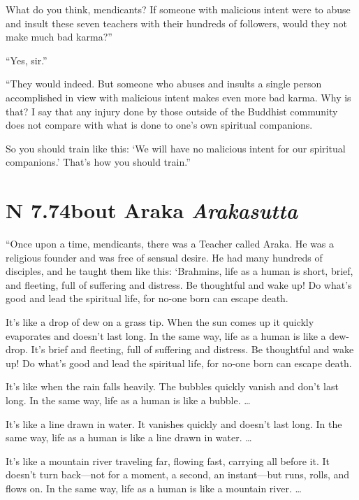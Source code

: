 \documentclass[12pt,openany]{book}%
\newcommand*{\suttatitleacronym}[1]{\smaller[2]{#1}\vspace*{.3em}}
\newcommand*{\suttatitletranslation}[1]{\linebreak{#1}}
\newcommand*{\suttatitleroot}[1]{\linebreak\smaller[2]\itshape{#1}}
\newcommand*{\tocacronym}[1]{\hspace*{-3.3em}{#1}\quad}
\newcommand*{\toctranslation}[1]{#1}
\newcommand*{\tocroot}[1]{(\textit{#1})}
\begin{document}
What do you think, mendicants? If someone with malicious intent were to abuse and insult these seven teachers with their hundreds of followers, would they not make much bad karma?” 

“Yes, sir.” 

“They would indeed. But someone who abuses and insults a single person accomplished in view with malicious intent makes even more bad karma. Why is that? I say that any injury done by those outside of the Buddhist community does not compare with what is done to one’s own spiritual companions. 

So you should train like this: ‘We will have no malicious intent for our spiritual companions.’ That’s how you should train.” 

%
\section*{{\suttatitleacronym AN 7.74}{\suttatitletranslation About Araka }{\suttatitleroot Arakasutta}}
\addcontentsline{toc}{section}{\tocacronym{AN 7.74} \toctranslation{About Araka } \tocroot{Arakasutta}}

“Once upon a time, mendicants, there was a Teacher called Araka. He was a religious founder and was free of sensual desire. He had many hundreds of disciples, and he taught them like this: ‘Brahmins, life as a human is short, brief, and fleeting, full of suffering and distress. Be thoughtful and wake up! Do what’s good and lead the spiritual life, for no-one born can escape death. 

It’s like a drop of dew on a grass tip. When the sun comes up it quickly evaporates and doesn’t last long. In the same way, life as a human is like a dew-drop. It’s brief and fleeting, full of suffering and distress. Be thoughtful and wake up! Do what’s good and lead the spiritual life, for no-one born can escape death. 

It’s like when the rain falls heavily. The bubbles quickly vanish and don’t last long. In the same way, life as a human is like a bubble. … 

It’s like a line drawn in water. It vanishes quickly and doesn’t last long. In the same way, life as a human is like a line drawn in water. … 

It’s like a mountain river traveling far, flowing fast, carrying all before it. It doesn’t turn back—not for a moment, a second, an instant—but runs, rolls, and flows on. In the same way, life as a human is like a mountain river. … 
\end{document}
